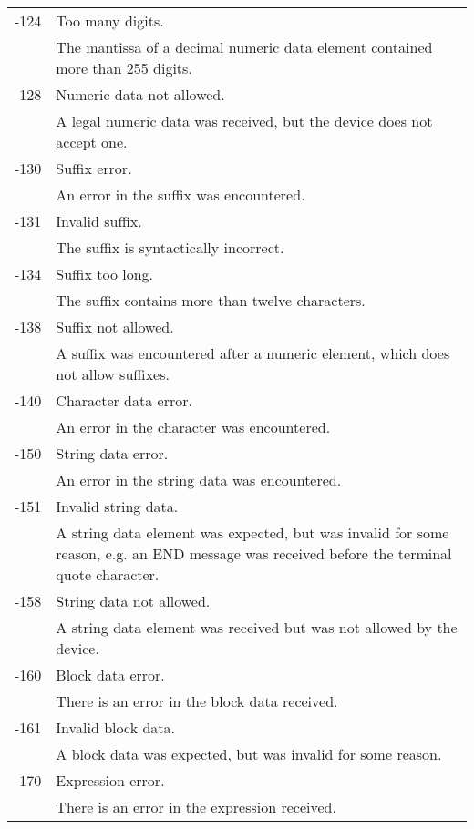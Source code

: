 \begin{longtable}{|l|p{25em}|}
-124			& Too many digits.\\ \cline{2-2}
					& The mantissa of a decimal numeric data element contained more than 255 digits.\\ \hline
-128			& Numeric data not allowed.\\ \cline{2-2}
					& A legal numeric data was received, but the device does not accept one.\\ \hline
-130			& Suffix error.\\ \cline{2-2}
					& An error in the suffix was encountered.\\ \hline
-131			& Invalid suffix.\\ \cline{2-2}
					& The suffix is syntactically incorrect.\\ \hline
-134			& Suffix too long.\\ \cline{2-2}
					& The suffix contains more than twelve characters.\\ \hline
-138			& Suffix not allowed.\\ \cline{2-2}
					& A suffix was encountered after a numeric element, which does not allow suffixes.\\ \hline
-140			& Character data error.\\ \cline{2-2}
					& An error in the character was encountered.\\ \hline
-150			& String data error.\\ \cline{2-2}
					& An error in the string data was encountered.\\ \hline
-151			& Invalid string data.\\ \cline{2-2}
					& A string data element was expected, but was invalid for some reason, e.g. an END message was received before the terminal quote character.\\ \hline
-158			& String data not allowed.\\ \cline{2-2}
					& A string data element was received but was not allowed by the device.\\ \hline
-160			& Block data error.\\ \cline{2-2}
					& There is an error in the block data received.\\ \hline
-161			& Invalid block data.\\ \cline{2-2}
					& A block data was expected, but was invalid for some reason.\\ \hline
-170			& Expression error.\\ \cline{2-2}
					& There is an error in the expression received.\\ \hline
\end{longtable}

